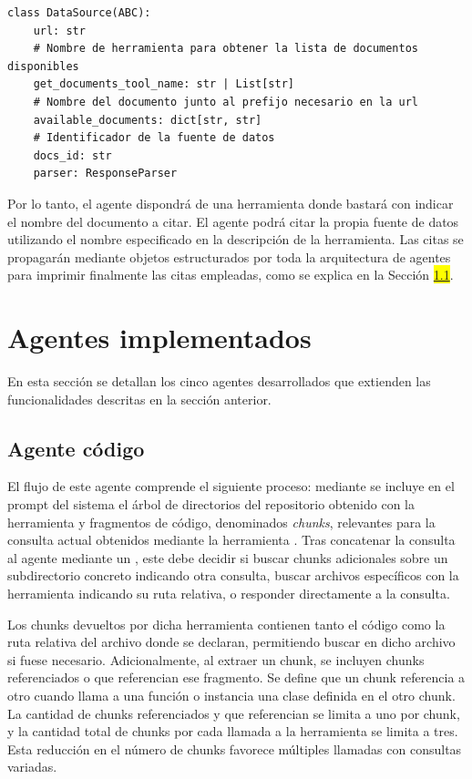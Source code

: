 \begin{lstlisting}[caption={\protect\opus{DataSource}: clase destinada a almacenar los documentos citables para una fuente de datos}, label={lst:data_src}]
class DataSource(ABC):
    url: str
    # Nombre de herramienta para obtener la lista de documentos disponibles
    get_documents_tool_name: str | List[str]
    # Nombre del documento junto al prefijo necesario en la url
    available_documents: dict[str, str]
    # Identificador de la fuente de datos
    docs_id: str
    parser: ResponseParser
\end{lstlisting}

Por lo tanto, el agente dispondrá de una herramienta donde bastará con indicar el nombre del documento a citar. El agente podrá citar la propia fuente de datos utilizando el nombre especificado en la descripción de la herramienta. Las citas se propagarán mediante objetos estructurados por toda la arquitectura de agentes para imprimir finalmente las citas empleadas, como se explica en la Sección \colorbox{yellow}{\ref{}}.


\section{Agentes implementados}
En esta sección se detallan los cinco agentes desarrollados que extienden las funcionalidades descritas en la sección anterior.

\subsection{Agente código}
El flujo de este agente comprende el siguiente proceso: mediante  se incluye en el prompt del sistema el árbol de directorios del repositorio obtenido con la herramienta  y fragmentos de código, denominados \textit{chunks}, relevantes para la consulta actual obtenidos mediante la herramienta . Tras concatenar la consulta al agente mediante un , este debe decidir si buscar chunks adicionales sobre un subdirectorio concreto indicando otra consulta, buscar archivos específicos con la herramienta  indicando su ruta relativa, o responder directamente a la consulta.

Los chunks devueltos por dicha herramienta contienen tanto el código como la ruta relativa del archivo donde se declaran, permitiendo buscar en dicho archivo si fuese necesario. Adicionalmente, al extraer un chunk, se incluyen chunks referenciados o que referencian ese fragmento. Se define que un chunk referencia a otro cuando llama a una función o instancia una clase definida en el otro chunk. La cantidad de chunks referenciados y que referencian se limita a uno por chunk, y la cantidad total de chunks por cada llamada a la herramienta se limita a tres. Esta reducción en el número de chunks favorece múltiples llamadas con consultas variadas.

